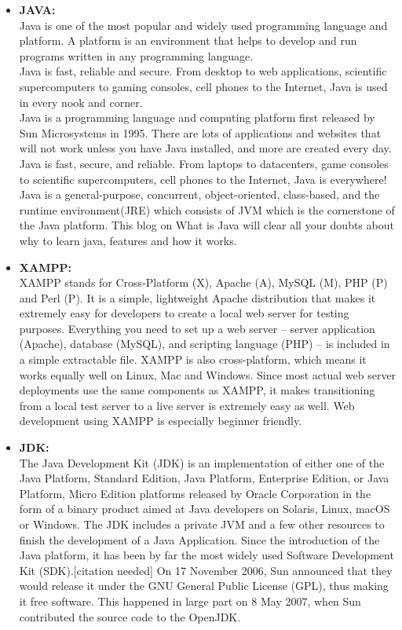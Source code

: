 \begin{itemize}
	\item \textbf{JAVA:}\\
	Java is one of the most popular and widely used programming language and platform. A platform is an environment that helps to develop and run programs written in any programming language.\\
	Java is fast, reliable and secure. From desktop to web applications, scientific supercomputers to gaming consoles, cell phones to the Internet, Java is used in every nook and corner.\\
	Java is a programming language and computing platform first released by Sun Microsystems in 1995. There are lots of applications and websites that will not work unless you have Java installed, and more are created every day. Java is fast, secure, and reliable. From laptops to datacenters, game consoles to scientific supercomputers, cell phones to the Internet, Java is everywhere! \\
	Java is a general-purpose, concurrent, object-oriented, class-based, and the runtime environment(JRE) which consists of JVM which is the cornerstone of the Java platform. This blog on What is Java will clear all your doubts about why to learn java, features and how it works.\\
	
	\item \textbf{XAMPP:}\\
	XAMPP stands for Cross-Platform (X), Apache (A), MySQL (M), PHP (P) and Perl (P). It is a simple, lightweight Apache distribution that makes it extremely easy for developers to create a local web server for testing purposes. Everything you need to set up a web server – server application (Apache), database (MySQL), and scripting language (PHP) – is included in a simple extractable file. XAMPP is also cross-platform, which means it works equally well on Linux, Mac and Windows. Since most actual web server deployments use the same components as XAMPP, it makes transitioning from a local test server to a live server is extremely easy as well. Web development using XAMPP is especially beginner friendly.\\
	
	\item \textbf{JDK:}\\ The Java Development Kit (JDK) is an implementation of either one of the Java Platform, Standard Edition, Java Platform, Enterprise Edition, or Java Platform, Micro Edition platforms released by Oracle Corporation in the form of a binary product aimed at Java developers on Solaris, Linux, macOS or Windows. The JDK includes a private JVM and a few other resources to finish the development of a Java Application. Since the introduction of the Java platform, it has been by far the most widely used Software Development Kit (SDK).[citation needed] On 17 November 2006, Sun announced that they would release it under the GNU General Public License (GPL), thus making it free software. This happened in large part on 8 May 2007, when Sun contributed the source code to the OpenJDK.\\
	

\end{itemize}
